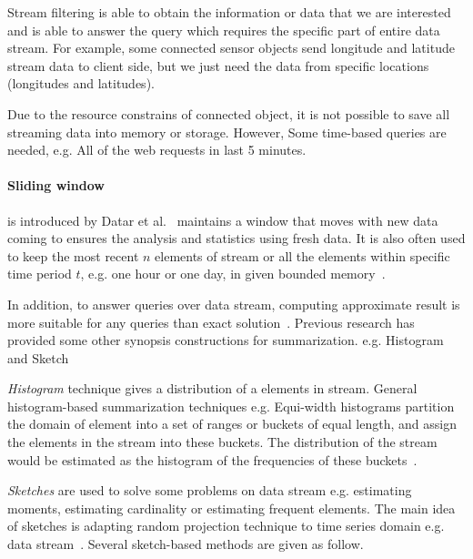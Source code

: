 Stream filtering is able to obtain the information or data that we are
interested and is able to answer the query which requires the specific part of
entire data stream. For example, some connected sensor objects send longitude
and latitude stream data to client side, but we just need the data from specific
locations (longitudes and latitudes).


Due to the resource constrains of connected object, it is not possible to save
all streaming data into memory or storage. However, Some time-based queries are
needed, e.g. All of the web requests in last 5 minutes.

\paragraph{Sliding window} is introduced by Datar et
al.~\cite{datar2002maintaining} maintains a window that moves with new data
coming to ensures the analysis and statistics using fresh data. It is also often
used to keep the most recent $n$ elements of stream or all the elements within
specific time period $t$, e.g. one hour or one day, in given bounded
memory~\cite{leskovec2014mining}. 


In addition, to answer queries over data stream, computing approximate result is
more suitable for any queries than exact solution~\cite{kejariwal2015real}.
Previous research has provided some other synopsis constructions for
summarization. e.g. Histogram~\cite{hesabi2015data, poosala1999approximate} and
Sketch

\emph{Histogram} technique gives a distribution of a elements in stream. General
histogram-based summarization techniques e.g. Equi-width histograms partition
the domain of element into a set of ranges or buckets of equal length, and
assign the elements in the stream into these buckets. The distribution of the
stream would be estimated as the histogram of the frequencies of these
buckets~\cite{kejariwal2015real, ahmed2019data}.

\emph{Sketches} are used to solve some problems on data stream e.g. estimating
moments, estimating cardinality or estimating frequent elements.  The main idea
of sketches is adapting random projection technique to time series domain e.g.
data stream~\cite{ahmed2019data}. Several sketch-based methods are given as
follow.

